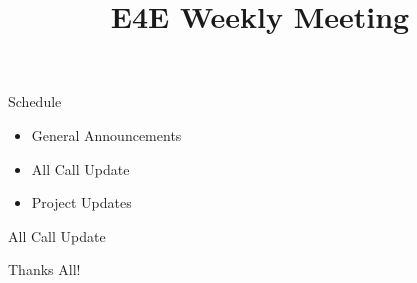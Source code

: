\documentclass[aspectratio=169]{beamer}
\title{E4E Weekly Meeting}
\institute{UC San Diego}
\begin{document}
\maketitle
\begin{frame}{Schedule}
    \begin{itemize}
        \item General Announcements
        \item All Call Update
              \begin{enumerate}
                  
              \end{enumerate}
        \item Project Updates
              \begin{enumerate}
                  
              \end{enumerate}
    \end{itemize}
\end{frame}

\begin{frame}{All Call Update}
    \begin{enumerate}
        
    \end{enumerate}
\end{frame}

\begin{frame}
    \centering
    Thanks All!
\end{frame}
\end{document}
